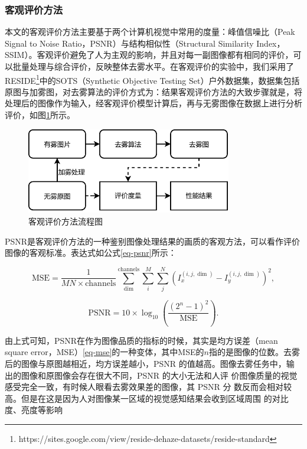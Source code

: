 \subsubsection{客观评价方法}
本文的客观评价方法主要基于两个计算机视觉中常用的度量：峰值信噪比（Peak Signal to Noise Ratio，PSNR）与结构相似性（Structural Similarity Index，SSIM）\cite{Zhou2004}。客观评价避免了人为主观的影响，并且对每一副图像都有相同的评价，可以批量处理与综合评价，反映整体去雾水平。在客观评价的实验中，我们采用了RESIDE\cite{li2019benchmarking}\footnote{https://sites.google.com/view/reside-dehaze-datasets/reside-standard}中的SOTS（Synthetic Objective Testing Set）户外数据集，数据集包括原图与加雾图，对去雾算法的评价方式为：结果客观评价方法的大致步骤就是，将处理后的图像作为输入，经客观评价模型计算后，再与无雾图像在数据上进行分析评价，如图\ref{fig6}所示。

\begin{figure}[htbp]
   \centering
   \includegraphics[width=0.8\textwidth]{./imgs/metric.pdf}
   \caption{客观评价方法流程图}
   \label{fig6}
\end{figure}


PSNR是客观评价方法的一种鉴别图像处理结果的画质的客观方法，可以看作评价图像的客观标准。表达式如公式\eqref{eq-psnr}所示：

\begin{equation}
    \text{MSE} = \frac{1}{MN\times\text{channels}}\sum\limits_{\dim}^{\text{channels}}\sum\limits_{i}^{M}\sum\limits_{j}^{N}(I_x^{(i,j,\dim)} -I_y^{(i,j,\dim)})^2,
    \label{eq-mse}
\end{equation}

\begin{equation}
    \text{PSNR} = 10\times\log_{10}\left(\frac{(2^n-1)^2}{\text{MSE}}\right).
    \label{eq-psnr}
\end{equation}

由上式可知，PSNR在作为图像品质的指标的时候，其实是均方误差（mean square error，MSE）\eqref{eq-mse}的一种变体，其中MSE的$n$指的是图像的位数。去雾后的图像与原图越相近，均方误差越小，PSNR 的值越高。图像去雾任务中，输出的图像和原图像会存在很大不同，PSNR 的大小无法和人评
价图像质量的视觉感受完全一致，有时候人眼看去雾效果差的图像，其 PSNR 分
数反而会相对较高。但是在这是因为人对图像某一区域的视觉感知结果会收到区域周围
的对比度、亮度等影响

